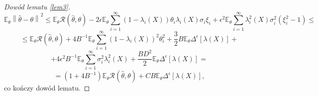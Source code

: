 \documentclass{mwart}
\newcommand{\norm}[1]{\left\lVert#1\right\rVert}
\begin{document}
\begin{proof}[Dowód lematu \ref{lem3}]
\begin{displaymath}
\mathbb{E}_{\theta}\norm{\hat{\theta}-\theta}^2\leq \mathbb{E}_{\theta}\mathcal{R}(\hat{\theta},\theta)-2\epsilon\mathbb{E}_{\theta}\sum_{i=1}^{\infty}(1-\lambda_i(X))\theta_i\lambda_i(X)\sigma_i\xi_i+\epsilon^2\mathbb{E}_{\theta}\sum_{i=1}^{\infty}\lambda_i^2(X)\sigma_i^2(\xi^2_i-1)\leq
\end{displaymath}
\begin{displaymath}
\leq \mathbb{E}_{\theta}\mathcal{R}(\hat{\theta},\theta)+4B^{-1}\mathbb{E}_{\theta}\sum_{i=1}^{\infty}(1-\lambda_i(X))^2\theta_i^2+\frac{3}{2}B\mathbb{E}_{\theta}\Delta^{\epsilon}[\lambda(X)]+
\end{displaymath}
\begin{displaymath}
+4\epsilon^2B^{-1}\mathbb{E}_{\theta}\sum_{i=1}^{\infty}\sigma_i^2\lambda_i^2(X)+\frac{BD^2}{2}\mathbb{E}_{\theta}\Delta^{\epsilon}[\lambda(X)]=
\end{displaymath}
\begin{displaymath}
=(1+4B^{-1})\mathbb{E}_{\theta}\mathcal{R}(\hat{\theta},\theta)+CB\mathbb{E}_{\theta}\Delta^{\epsilon}[\lambda (X)],
\end{displaymath}
co kończy dowód lematu.
\end{proof}
\end{document}
